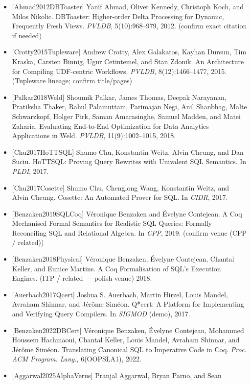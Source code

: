 \documentclass[
]{article}
\begin{document}
\begin{itemize}
\item
  {[}Ahmad2012DBToaster{]} Yanif Ahmad, Oliver Kennedy, Christoph Koch,
  and Milos Nikolic. DBToaster: Higher-order Delta Processing for
  Dynamic, Frequently Fresh Views. \emph{PVLDB}, 5(10):968--979, 2012.
  (confirm exact citation if needed)
\item
  {[}Crotty2015Tupleware{]} Andrew Crotty, Alex Galakatos, Kayhan
  Dursun, Tim Kraska, Carsten Binnig, Ugur Cetintemel, and Stan Zdonik.
  An Architecture for Compiling UDF-centric Workflows. \emph{PVLDB},
  8(12):1466--1477, 2015. (Tupleware lineage; confirm title/pages)
\item
  {[}Palkar2018Weld{]} Shoumik Palkar, James Thomas, Deepak Narayanan,
  Pratiksha Thaker, Rahul Palamuttam, Parimajan Negi, Anil Shanbhag,
  Malte Schwarzkopf, Holger Pirk, Saman Amarasinghe, Samuel Madden, and
  Matei Zaharia. Evaluating End-to-End Optimization for Data Analytics
  Applications in Weld. \emph{PVLDB}, 11(9):1002--1015, 2018.
\item
  {[}Chu2017HoTTSQL{]} Shumo Chu, Konstantin Weitz, Alvin Cheung, and
  Dan Suciu. HoTTSQL: Proving Query Rewrites with Univalent SQL
  Semantics. In \emph{PLDI}, 2017.
\item
  {[}Chu2017Cosette{]} Shumo Chu, Chenglong Wang, Konstantin Weitz, and
  Alvin Cheung. Cosette: An Automated Prover for SQL. In \emph{CIDR},
  2017.
\item
  {[}Benzaken2019SQLCoq{]} Véronique Benzaken and Évelyne Contejean. A
  Coq Mechanised Formal Semantics for Realistic SQL Queries: Formally
  Reconciling SQL and Relational Algebra. In \emph{CPP}, 2019. (confirm
  venue (CPP / related))
\item
  {[}Benzaken2018Physical{]} Véronique Benzaken, Évelyne Contejean,
  Chantal Keller, and Eunice Martins. A Coq Formalisation of SQL's
  Execution Engines. (ITP / related --- polish venue) 2018.
\item
  {[}Auerbach2017Qcert{]} Joshua S. Auerbach, Martin Hirzel, Louis
  Mandel, Avraham Shinnar, and Jérôme Siméon. Q*cert: A Platform for
  Implementing and Verifying Query Compilers. In \emph{SIGMOD} (demo),
  2017.
\item
  {[}Benzaken2022DBCert{]} Véronique Benzaken, Évelyne Contejean,
  Mohammed Houssem Hachmaoui, Chantal Keller, Louis Mandel, Avraham
  Shinnar, and Jérôme Siméon. Translating Canonical SQL to Imperative
  Code in Coq. \emph{Proc. ACM Program. Lang.}, 6(OOPSLA1), 2022.
\item
  {[}Aggarwal2025AlphaVerus{]} Pranjal Aggarwal, Bryan Parno, and Sean

\end{itemize}
\end{document}
